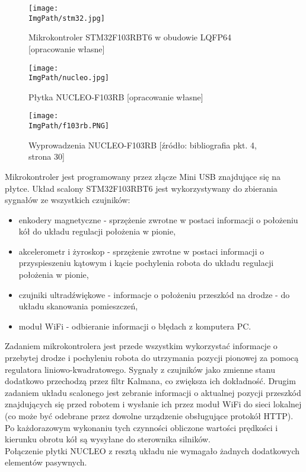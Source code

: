 \documentclass[a4paper,12pt,twoside,openany]{report}
\newcommand{\ImgPath}{.}
\begin{document}
\begin{figure}[!htbp]
	\begin{center}
\centering
\texttt{[image: \\ImgPath/stm32.jpg]}
\end{center}
	\caption{Mikrokontroler STM32F103RBT6 w obudowie LQFP64 [opracowanie własne]}
	\label{schematKomunikacji}
\end{figure}

\begin{figure}[!htbp]
	\begin{center}
\centering
\texttt{[image: \\ImgPath/nucleo.jpg]}
\end{center}
	\caption{Płytka NUCLEO-F103RB [opracowanie własne]}
	\label{schematKomunikacji}
\end{figure}

\begin{figure}[!htbp]
	\begin{center}
\centering
\texttt{[image: \\ImgPath/f103rb.PNG]}
\end{center}
	\caption{Wyprowadzenia NUCLEO-F103RB [źródło: bibliografia pkt. 4, strona 30]}
	\label{schematKomunikacji}
\end{figure}

\newpage

Mikrokontroler jest programowany przez złącze Mini USB znajdujące się na płytce. Układ scalony STM32F103RBT6 jest wykorzystywany do zbierania sygnałów ze wszystkich czujników:
\begin{itemize}
\item enkodery magnetyczne - sprzężenie zwrotne w postaci informacji o położeniu kół do układu regulacji położenia w pionie,
\item akcelerometr i żyroskop - sprzężenie zwrotne w postaci informacji o przyspieszeniu kątowym i kącie pochylenia robota do układu regulacji położenia w pionie,
\item czujniki ultradźwiękowe - informacje o położeniu przeszkód na drodze - do układu skanowania pomieszczeń,
\item moduł WiFi - odbieranie informacji o błędach z komputera PC.
\end{itemize}

Zadaniem mikrokontrolera jest przede wszystkim wykorzystać informacje o przebytej drodze i pochyleniu robota do utrzymania pozycji pionowej za pomocą regulatora liniowo-kwadratowego. Sygnały z czujników jako zmienne stanu dodatkowo przechodzą przez filtr Kalmana, co zwiększa ich dokładność. Drugim zadaniem układu scalonego jest zebranie informacji o aktualnej pozycji przeszkód znajdujących się przed robotem i wysłanie ich przez moduł WiFi do sieci lokalnej (co może być odebrane przez dowolne urządzenie obsługujące protokół HTTP). Po każdorazowym wykonaniu tych czynności obliczone wartości prędkości i kierunku obrotu kół są wysyłane do sterownika silników.\\
Połączenie płytki NUCLEO z resztą układu nie wymagało żadnych dodatkowych elementów pasywnych.
\end{document}
